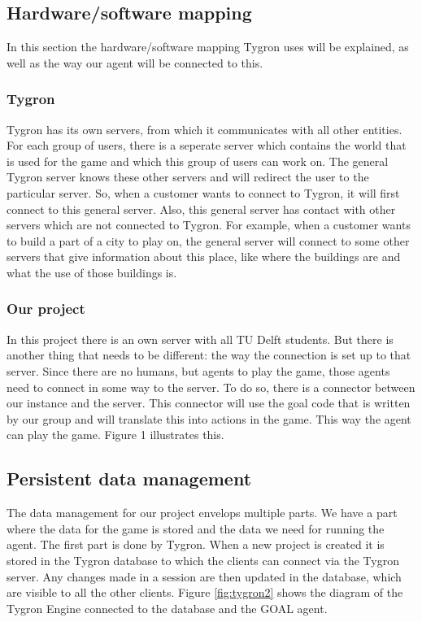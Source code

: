 \newpage
\subsection{Hardware/software mapping}
In this section the hardware/software mapping Tygron uses will be explained, as well as the way our agent will be connected to this.

\subsubsection{Tygron}
Tygron has its own servers, from which it communicates with all other entities. For each group of users, there is a seperate server which contains the world that is used for the game and which this group of users can work on. The general Tygron server knows these other servers and will redirect the user to the particular server. So, when a customer wants to connect to Tygron, it will first connect to this general server. Also, this general server has contact with other servers which are not connected to Tygron. For example, when a customer wants to build a part of a city to play on, the general server will connect to some other servers that give information about this place, like where the buildings are and what the use of those buildings is. 

\subsubsection{Our project}

In this project there is an own server with all TU Delft students. But there is another thing that needs to be different: the way the connection is set up to that server. Since there are no humans, but agents to play the game, those agents need to connect in some way to the server. To do so, there is a connector between our instance and the server. This connector will use the goal code that is written by our group and will translate this into actions in the game. This way the agent can play the game. Figure 1 illustrates this.

\newpage
\subsection{Persistent data management}
The data management for our project envelops multiple parts. We have a part where the data for the game is stored and the data we need for running the agent. The first part is done by Tygron. When a new project is created it is stored in the Tygron database to which the clients can connect via the Tygron server. Any changes made in a session are then updated in the database, which are visible to all the other clients. Figure \ref{fig:tygron2} shows the diagram of the Tygron Engine connected to the database and the GOAL agent.


